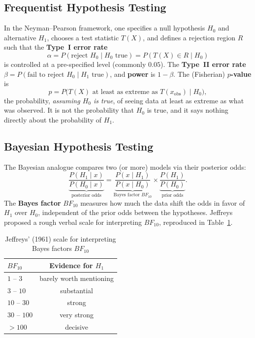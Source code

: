 \documentclass[11pt,a4paper]{article}
\begin{document}
\subsection{Frequentist Hypothesis Testing}
In the Neyman--Pearson framework, one specifies a null hypothesis $H_0$ and alternative $H_1$, chooses a test statistic $T(X)$, and defines a rejection region $R$ such that the \textbf{Type~I error rate}
\begin{equation}
\alpha = P(\text{reject } H_0 \mid H_0 \text{ true}) = P(T(X) \in R \mid H_0)
\end{equation}
is controlled at a pre-specified level (commonly $0.05$). The \textbf{Type~II error rate} $\beta = P(\text{fail to reject } H_0 \mid H_1 \text{ true})$, and \textbf{power} is $1-\beta$. The (Fisherian) \textbf{$p$-value} is
\begin{equation}
p = P\big(T(X) \text{ at least as extreme as } T(x_{\text{obs}}) \mid H_0\big),
\end{equation}
the probability, \emph{assuming $H_0$ is true}, of seeing data at least as extreme as what was observed. It is not the probability that $H_0$ is true, and it says nothing directly about the probability of $H_1$.

\subsection{Bayesian Hypothesis Testing}
The Bayesian analogue compares two (or more) models via their posterior odds:
\begin{equation}
\underbrace{\frac{P(H_1 \mid x)}{P(H_0 \mid x)}}_{\text{posterior odds}} = \underbrace{\frac{P(x \mid H_1)}{P(x \mid H_0)}}_{\text{Bayes factor } BF_{10}} \times \underbrace{\frac{P(H_1)}{P(H_0)}}_{\text{prior odds}}.
\label{eq:bf}
\end{equation}
The \textbf{Bayes factor} $BF_{10}$ measures how much the data shift the odds in favor of $H_1$ over $H_0$, independent of the prior odds between the hypotheses. Jeffreys proposed a rough verbal scale for interpreting $BF_{10}$, reproduced in Table~\ref{tab:jeffreys}.

\begin{table}[h]
\centering
\caption{Jeffreys' (1961) scale for interpreting Bayes factors $BF_{10}$}
\label{tab:jeffreys}
\begin{tabular}{@{}lc@{}}
\toprule
\textbf{$BF_{10}$} & \textbf{Evidence for $H_1$} \\
\midrule
$1$ -- $3$ & barely worth mentioning \\
$3$ -- $10$ & substantial \\
$10$ -- $30$ & strong \\
$30$ -- $100$ & very strong \\
$>100$ & decisive \\
\bottomrule
\end{tabular}
\end{table}
\end{document}
